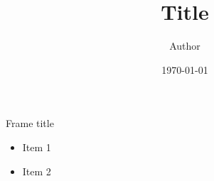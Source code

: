 \documentclass{beamer}
\title[Title]{Title}
\author{Author}
\institute{Institute}
\date{\today}
\begin{document}
{
\begin{frame}
\maketitle
\end{frame}
}

\begin{frame}{Frame title}
  \begin{itemize}
  \item Item 1
  \item Item 2
  \end{itemize}
\end{frame}
\end{document}
